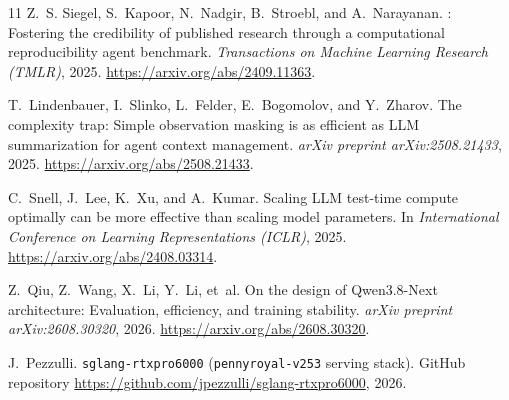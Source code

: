\documentclass[10pt]{article}
\newcommand{\code}[1]{\texttt{#1}}
\begin{document}
\begin{thebibliography}{11}
Z.~S. Siegel, S.~Kapoor, N.~Nadgir, B.~Stroebl, and A.~Narayanan.
: Fostering the credibility of published research through a computational reproducibility agent benchmark.
\newblock \emph{Transactions on Machine Learning Research (TMLR)}, 2025.
\newblock \url{https://arxiv.org/abs/2409.11363}.

T.~Lindenbauer, I.~Slinko, L.~Felder, E.~Bogomolov, and Y.~Zharov.
\newblock The complexity trap: Simple observation masking is as efficient as {LLM} summarization for agent context management.
\newblock \emph{arXiv preprint arXiv:2508.21433}, 2025.
\newblock \url{https://arxiv.org/abs/2508.21433}.

C.~Snell, J.~Lee, K.~Xu, and A.~Kumar.
\newblock Scaling {LLM} test-time compute optimally can be more effective than scaling model parameters.
\newblock In \emph{International Conference on Learning Representations (ICLR)}, 2025.
\newblock \url{https://arxiv.org/abs/2408.03314}.

Z.~Qiu, Z.~Wang, X.~Li, Y.~Li, et~al.
\newblock On the design of {Qwen3.8-Next} architecture: Evaluation, efficiency, and training stability.
\newblock \emph{arXiv preprint arXiv:2608.30320}, 2026.
\newblock \url{https://arxiv.org/abs/2608.30320}.

J.~Pezzulli.
\newblock \code{sglang-rtxpro6000} (\code{pennyroyal-v253} serving stack).
\newblock GitHub repository \url{https://github.com/jpezzulli/sglang-rtxpro6000}, 2026.

\end{thebibliography}
\end{document}
